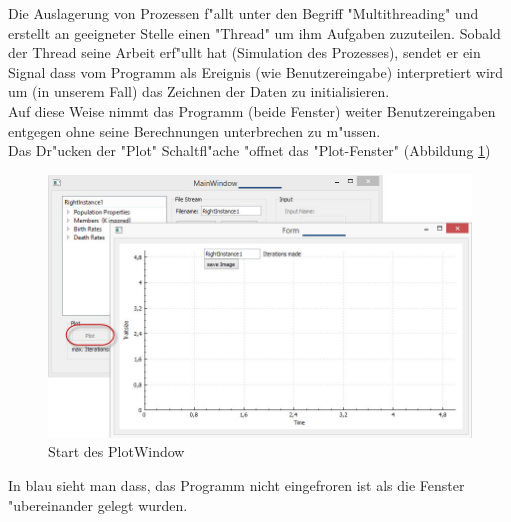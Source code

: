 \documentclass[11pt, a4paper, german]{article}
\theoremstyle{plain}
\begin{document}
	Die Auslagerung von Prozessen f"allt unter den Begriff "{}Multithreading"{} und erstellt an geeigneter Stelle einen "{}Thread"{} um ihm Aufgaben zuzuteilen. Sobald der Thread seine Arbeit erf"ullt hat (Simulation des Prozesses), sendet er ein Signal dass vom Programm als Ereignis (wie Benutzereingabe) interpretiert wird um (in unserem Fall) das Zeichnen der Daten zu initialisieren.\\
	Auf diese Weise nimmt das Programm (beide Fenster) weiter Benutzereingaben entgegen ohne seine Berechnungen unterbrechen zu m"ussen.\\
	Das Dr"ucken der "{}Plot"{} Schaltfl"ache "offnet das "{}Plot-Fenster"{} (Abbildung \ref{PlotWindow_start})
	\begin{figure}[H]
		\centering
		\includegraphics[width=1\linewidth]{./Pictures/PlotWindow_start}
		\caption[PlotWindow_start]{Start des PlotWindow}
		\label{PlotWindow_start}
	\end{figure}
	In blau sieht man dass, das Programm nicht eingefroren ist als die Fenster "ubereinander gelegt wurden.
	
\end{document}
